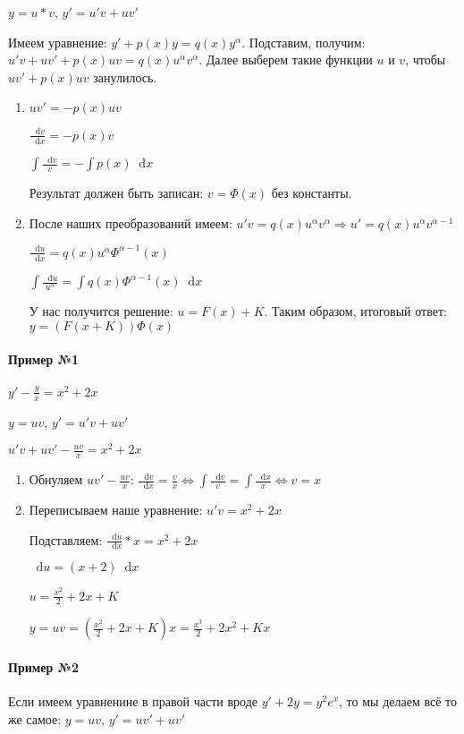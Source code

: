 \documentclass{article}
\newcommand*\diff{\mathop{}\!\mathrm{d}}
\begin{document}
$y = u * v$, $y' = u' v + u v'$

Имеем уравнение: $y' + p(x) y = q(x) y^{\alpha}$. Подставим, получим: $u' v + u v' + p(x) u v = q(x) u^\alpha v^\alpha$. Далее выберем такие функции $u$ и $v$, чтобы $uv' + p(x) u v$ занулилось.

\begin{enumerate}
    \item $uv' = -p(x) u v$

    $\frac{\diff v}{\diff x} = - p(x) v$

    $\int\frac{\diff v}{v} = - \int p(x) \diff x$

    Результат должен быть записан: $v = \Phi(x)$ без константы.
    \item После наших преобразований имеем: $u' v = q(x) u^\alpha v^\alpha \Longrightarrow u' = q(x) u^\alpha v^{\alpha - 1}$
    
    $\frac{\diff u}{\diff x} = q(x) u^\alpha \Phi^{\alpha - 1}(x)$

    $\int \frac{\diff u}{u^{\alpha}} = \int q(x) \Phi^{\alpha - 1}(x) \diff x$

    У нас получится решение: $u = F(x) + K$. Таким образом, итоговый ответ: $y = (F(x + K)) \Phi(x)$
\end{enumerate}

\paragraph{Пример №1} $y' - \frac{y}{x} = x^2 + 2x$

$y = u v$, $y' = u' v + u v'$

$u'v + uv' - \frac{uv}{x} = x^2 + 2x$

\begin{enumerate}
    \item Обнуляем $uv' - \frac{uv}{x}$: $\frac{\diff v}{\diff x} = \frac{v}{x} \Longleftrightarrow \int \frac{\diff v}{v} = \int \frac{\diff x}{x} \Longleftrightarrow v = x$
    \item Переписываем наше уравнение: $u' v = x^2 + 2x$

    Подставляем: $\frac{\diff u}{\diff x} * x = x^2 + 2x$

    $\diff u = (x + 2) \diff x$

    $u = \frac{x^2}{2} + 2x + K$

    $y = u v = (\frac{x^2}{2} + 2x + K) x = \frac{x^3}{2} + 2x^2 + K x$
\end{enumerate}

\paragraph{Пример №2} Если имеем уравненине в правой части вроде $y' + 2y = y^2 e^{x}$, то мы делаем всё то же самое: $y = uv$, $y' = uv' + uv'$
\end{document}
